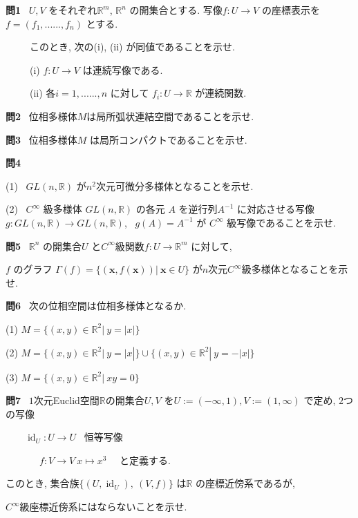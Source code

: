 \documentclass[dvipdfmx]{jsarticle}
\DeclareMathOperator{\id}{id} %
\begin{document}
\textbf{問1} \ $U, V$ をそれぞれ$\mathbb{R}^m$, $\mathbb{R}^n$ の開集合とする. 
写像$f: U \to V$ の座標表示を$f = (f_1, ......, f_n)$ とする.

\ \ \ \ \ このとき, 次の(i), (ii) が同値であることを示せ.

\ \ \ \ \ (i) $f: U \to V$ は連続写像である.

\ \ \ \ \ (ii) 各$i=1, ......, n$ に対して $f_i: U \to \mathbb{R}$ が連続関数.

\bigskip

\textbf{問2} \ 位相多様体$M$は局所弧状連結空間であることを示せ.

\bigskip

\textbf{問3} \ 位相多様体$M$ は局所コンパクトであることを示せ.

\bigskip

\textbf{問4} \ 

(1) \ $GL(n,\mathbb{R})$ が$n^2$次元可微分多様体となることを示せ.

(2) \ $C^{\infty}$ 級多様体 $GL(n, \mathbb{R})$ の各元 $A$ を逆行列$A^{-1}$ に対応させる写像 $g : GL(n, \mathbb{R}) \to GL(n, \mathbb{R})$, \ $g(A) = A^{-1}$ が $C^{\infty}$ 級写像であることを示せ.

\bigskip

\textbf{問5} \ $\mathbb{R}^n$ の開集合$U$ と$C^{\infty}$級関数$f: U \to \mathbb{R}^m$ に対して, 

$f$ のグラフ $\Gamma(f) = \{(\bm{x}, f(\bm{x})) | \ \bm{x} \in U\}$ が$n$次元$C^{\infty}$級多様体となることを示せ.

\bigskip

\textbf{問6} \ 次の位相空間は位相多様体となるか.

(1) $M = \{(x,y) \in \mathbb{R}^2 | \ y = |x| \}$

(2) $M = \{(x,y) \in \mathbb{R}^2 | \ y = |x| \} \cup
         \{(x,y) \in \mathbb{R}^2 | \ y = -|x| \}$

(3) $M = \{(x,y) \in \mathbb{R}^2 | \ xy = 0\}$

\bigskip

\textbf{問7} \ $1$次元Euclid空間$\mathbb{R}$の開集合$U, V$ を$U:= (-\infty, 1), V:= (1, \infty)$ で定め, $2$つの写像

 \ \ \ \ $\id_U : U \to U$ \ 恒等写像

 \ \ \ \ \ \ \ $f : V \to V \ x \mapsto x^3$ \ \ と定義する.

このとき, 集合族$\{(U, \id_U), \ (V, f) \}$ は$\mathbb{R}$ の座標近傍系であるが, 

$C^{\infty}$級座標近傍系にはならないことを示せ.
\end{document}
